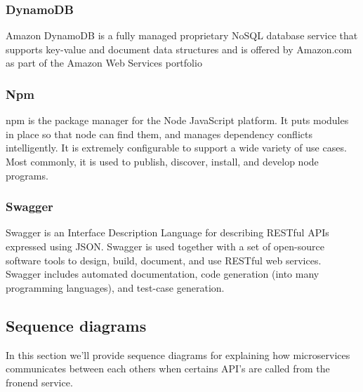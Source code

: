 \subsubsection{DynamoDB}
Amazon DynamoDB is a fully managed proprietary NoSQL database service that supports key-value and document data structures and is offered by Amazon.com as part of the Amazon Web Services portfolio
\subsubsection{Npm}
npm is the package manager for the Node JavaScript platform. It puts modules in place so that node can find them, and manages dependency conflicts intelligently.
It is extremely configurable to support a wide variety of use cases. Most commonly, it is used to publish, discover, install, and develop node programs.
\subsubsection{Swagger}
Swagger is an Interface Description Language for describing RESTful APIs expressed using JSON. Swagger is used together with a set of open-source software tools to design, build, document, and use RESTful web services. Swagger includes automated documentation, code generation (into many programming languages), and test-case generation.


\subsection{Sequence diagrams}
In this section we'll provide sequence diagrams for explaining how microservices communicates between each others
when certains API's are called from the fronend service.

